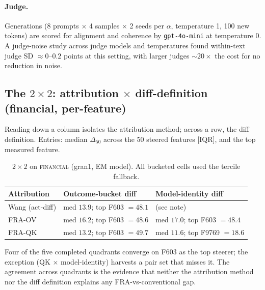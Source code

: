 \documentclass{article}
\theoremstyle{plain}
\theoremstyle{definition}
\theoremstyle{remark}
\begin{document}
\paragraph{Judge.} Generations (8 prompts $\times$ 4 samples $\times$ 2 seeds per $\alpha$, temperature 1, 100 new tokens) are scored for alignment and coherence by \texttt{gpt-4o-mini} at temperature 0. A judge-noise study across judge models and temperatures found within-text judge SD ${\approx}0$--$0.2$ points at this setting, with larger judges ${\sim}20\times$ the cost for no reduction in noise.

\subsection{The $2\times2$: attribution $\times$ diff-definition (financial, per-feature)}
Reading down a column isolates the attribution method; across a row, the diff definition. Entries: median $\Delta_{50}$ across the 50 steered features [IQR], and the top measured feature.

\begin{table}[h]
\caption{$2\times2$ on \textsc{financial} (gran1, EM model). All bucketed cells used the tercile fallback.}
\label{tab:em2x2}
\centering
\small
\begin{tabular}{lll}
\toprule
Attribution & Outcome-bucket diff & Model-identity diff \\
\midrule
Wang (act-diff) & med $13.9$; top F603 $= 48.1$ & (see note) \\
FRA-OV & med $16.2$; top F603 $= 48.6$ & med $17.0$; top F603 $= 48.4$ \\
FRA-QK & med $13.2$; top F603 $= 49.7$ & med $11.6$; top F9769 $= 18.6$ \\
\bottomrule
\end{tabular}
\end{table}

Four of the five completed quadrants converge on F603 as the top steerer; the exception (QK $\times$ model-identity) harvests a pair set that misses it. The agreement across quadrants is the evidence that neither the attribution method nor the diff definition explains any FRA-vs-conventional gap.
\end{document}

